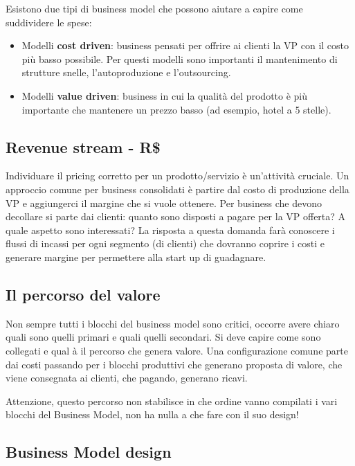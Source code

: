 Esistono due tipi di business model che possono aiutare a capire come
suddividere le spese:

\begin{itemize}
 \item Modelli \textbf{cost driven}: business pensati per offrire ai clienti
la VP con il costo più basso possibile. Per questi modelli sono importanti
il mantenimento di strutture snelle, l'autoproduzione e l'outsourcing.
 \item Modelli \textbf{value driven}: business in cui la qualità del prodotto
è più importante che mantenere un prezzo basso (ad esempio, hotel a 5 stelle).
\end{itemize}

\subsection{Revenue stream - R\$}

Individuare il pricing corretto per un prodotto/servizio è un'attività
cruciale. Un approccio comune per business consolidati è partire dal costo di
produzione della VP e aggiungerci il margine che si vuole ottenere.
Per business che devono decollare si parte dai clienti: quanto sono disposti a
pagare per la VP offerta? A quale aspetto sono interessati? La risposta
a questa domanda farà conoscere i flussi di incassi per ogni segmento
(di clienti) che dovranno coprire i costi e generare margine per permettere
alla start up di guadagnare.

\subsection{Il percorso del valore}

Non sempre tutti i blocchi del business model sono critici, occorre avere
chiaro quali sono quelli primari e quali quelli secondari. Si deve capire come
sono collegati e qual à il percorso che genera valore. Una configurazione
comune parte dai costi passando per i blocchi produttivi che generano proposta
di valore, che viene consegnata ai clienti, che pagando, generano ricavi.

Attenzione, questo percorso non stabilisce in che ordine vanno compilati i
vari blocchi del Business Model, non ha nulla a che fare con il suo design!

\subsection{Business Model design}

